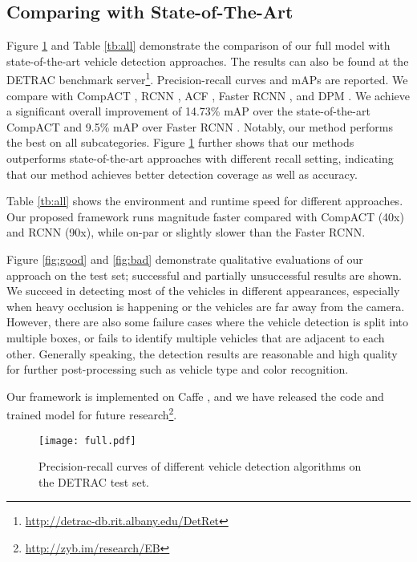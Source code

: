 \documentclass[5pt]{article}
\begin{document}
\subsection{Comparing with State-of-The-Art}

Figure \ref{fig:pr} and Table \ref{tb:all} demonstrate the comparison of our full model with state-of-the-art vehicle detection approaches. The results can also be found at the DETRAC benchmark server\footnote{\url{http://detrac-db.rit.albany.edu/DetRet}}. Precision-recall curves and mAPs are reported. We compare with CompACT \cite{cai2015learning}, RCNN \cite{girshick2014rich}, ACF \cite{dollar2014fast}, Faster RCNN \cite{renNIPS15fasterrcnn}, and DPM \cite{felzenszwalb2010object}. We achieve a significant overall improvement of 14.73\% mAP over the state-of-the-art CompACT \cite{cai2015learning} and 9.5\% mAP over Faster RCNN \cite{renNIPS15fasterrcnn}. Notably, our method performs the best on all subcategories. Figure \ref{fig:pr} further shows that our methods outperforms state-of-the-art approaches with different recall setting, indicating that our method achieves better detection coverage as well as accuracy.

Table \ref{tb:all} shows the environment and runtime speed for different approaches. Our proposed framework runs magnitude faster compared with CompACT (40x) and RCNN (90x), while on-par or slightly slower than the Faster RCNN.

Figure \ref{fig:good} and \ref{fig:bad} demonstrate qualitative evaluations of our approach on the test set; successful and partially unsuccessful results are shown. We succeed in detecting most of the vehicles in different appearances, especially when heavy occlusion is happening or the vehicles are far away from the camera. However, there are also some failure cases where the vehicle detection is split into multiple boxes, or fails to identify multiple vehicles that are adjacent to each other. Generally speaking, the detection results are reasonable and high quality for further post-processing such as vehicle type and color recognition.

Our framework is implemented on Caffe \cite{jia2014caffe}, and we have released the code and trained model for future research\footnote{\url{http://zyb.im/research/EB}}.

\begin{figure}[t]
  \centering
  \texttt{[image: full.pdf]}
  \caption{Precision-recall curves of different vehicle detection algorithms on the DETRAC test set.}
  \label{fig:pr}
  \vspace{-0.1in}
\end{figure}
\end{document}
